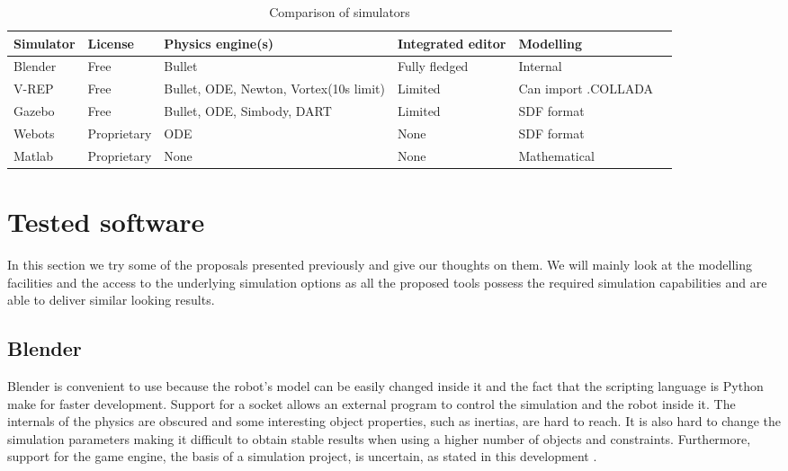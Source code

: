 \begin{table}[htp]
\center
\begin{tabularx}{\textwidth}{@{} l l X X X X @{}}
\toprule
\textbf{Simulator} & \textbf{License} & \textbf{Physics engine(s)} & \textbf{Integrated editor} & \textbf{Modelling}\\ 
\midrule
Blender & Free & Bullet & Fully fledged & Internal\\ 

V-REP & Free & Bullet, ODE, Newton, Vortex(10s limit) & Limited & Can import .COLLADA\\

Gazebo & Free & Bullet, ODE, Simbody, DART & Limited & SDF format\\

Webots & Proprietary & ODE & None & SDF format\\

Matlab & Proprietary & None & None & Mathematical\\
\bottomrule
\end{tabularx}
\caption{Comparison of simulators}
\label{table:simulators_comp}
\end{table}

\section{Tested software}
In this section we try some of the proposals presented previously and give our thoughts on them. We will mainly look at the modelling facilities and the access to the underlying simulation options as all the proposed tools possess the required simulation capabilities and are able to deliver similar looking results.

\subsection{Blender}
Blender is convenient to use because the robot's model can be easily changed inside it and the fact that the scripting language is Python make for faster development. Support for a socket allows an external program to control the simulation and the robot inside it. The internals of the physics are obscured and some interesting object properties, such as inertias, are hard to reach. It is also hard to change the simulation parameters making it difficult to obtain stable results when using a higher number of objects and constraints. Furthermore, support for the game engine, the basis of a simulation project, is uncertain, as stated in this development \cite{blender_roadmap}.

